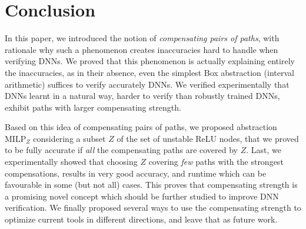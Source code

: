 \documentclass{llncs}
\newcommand{\MILP}{{\textrm{MILP}}}
\begin{document}
\vspace{-0.2cm}
\section{Conclusion}
\vspace{-0.2cm}

In this paper, we introduced the notion of {\em compensating pairs of paths}, with rationale why such a phenomenon creates inaccuracies hard to handle when verifying DNNs. We proved that this phenomenon is actually explaining entirely the inaccuracies, as in their absence, even the simplest Box abstraction (interval arithmetic) suffices to verify accurately DNNs. We verified experimentally that DNNs learnt in a natural way, harder to verify than robustly trained DNNs, exhibit paths with larger compensating strength. 

Based on this idea of compensating pairs of paths, we proposed abstraction $\MILP_{Z}$ considering a subset $Z$ of the set of unstable ReLU nodes, that we proved to be fully accurate if {\em all} the compensating paths are covered by $Z$. Last, we experimentally showed that choosing $Z$ covering {\em few} paths with the strongest compensations, results in very good accuracy, and runtime which can be favourable in some (but not all) cases. This proves that compensating strength is a promising novel concept which should be further studied to improve DNN verification. We finally proposed several ways to use the compensating strength to optimize current tools in different directions, and leave that as future work.

\newpage




\newpage

\appendix


\end{document}
